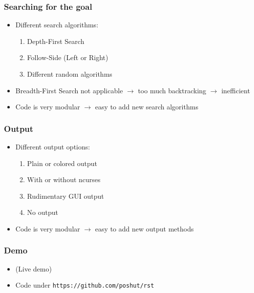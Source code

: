 \documentclass{beamer}
\begin{document}
\begin{frame}
    \frametitle{Searching for the goal}
    \begin{itemize}
        \item Different search algorithms:
            \begin{enumerate}
                \item Depth-First Search
                \item Follow-Side (Left or Right)
                \item Different random algorithms
            \end{enumerate}
        \item Breadth-First Search not applicable $\rightarrow$ too much backtracking $\rightarrow$ inefficient
        \item Code is very modular $\rightarrow$ easy to add new search algorithms
    \end{itemize}
\end{frame}

\begin{frame}
    \frametitle{Output}
    \begin{itemize}
        \item Different output options:
            \begin{enumerate}
                \item Plain or colored output
                \item With or without ncurses
                \item Rudimentary GUI output
                \item No output
            \end{enumerate}
        \item Code is very modular $\rightarrow$ easy to add new output methods
    \end{itemize}
\end{frame}
\begin{frame}
    \frametitle{Demo}
    \begin{itemize}
        \item (Live demo)
        \item Code under \small \texttt{https://github.com/poshut/rst}
    \end{itemize}
\end{frame}
\end{document}
